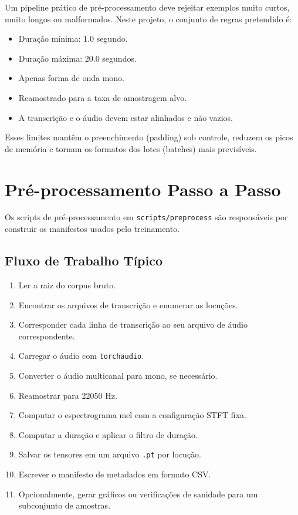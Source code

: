 \documentclass[11pt]{article}
\newcommand{\pathtt}[1]{\texttt{#1}}
\begin{document}
Um pipeline prático de pré-processamento deve rejeitar exemplos muito curtos, muito longos ou malformados. Neste projeto, o conjunto de regras pretendido é:

\begin{itemize}[leftmargin=1.5em]
  \item Duração mínima: 1.0 segundo.
  \item Duração máxima: 20.0 segundos.
  \item Apenas forma de onda mono.
  \item Reamostrado para a taxa de amostragem alvo.
  \item A transcrição e o áudio devem estar alinhados e não vazios.
\end{itemize}

Esses limites mantêm o preenchimento (padding) sob controle, reduzem os picos de memória e tornam os formatos dos lotes (batches) mais previsíveis.

\section{Pré-processamento Passo a Passo}

Os scripts de pré-processamento em \pathtt{scripts/preprocess} são responsáveis por construir os manifestos usados pelo treinamento.

\subsection{Fluxo de Trabalho Típico}

\begin{enumerate}[leftmargin=1.5em]
  \item Ler a raiz do corpus bruto.
  \item Encontrar os arquivos de transcrição e enumerar as locuções.
  \item Corresponder cada linha de transcrição ao seu arquivo de áudio correspondente.
  \item Carregar o áudio com \pathtt{torchaudio}.
  \item Converter o áudio multicanal para mono, se necessário.
  \item Reamostrar para 22050 Hz.
  \item Computar o espectrograma mel com a configuração STFT fixa.
  \item Computar a duração e aplicar o filtro de duração.
  \item Salvar os tensores em um arquivo \pathtt{.pt} por locução.
  \item Escrever o manifesto de metadados em formato CSV.
  \item Opcionalmente, gerar gráficos ou verificações de sanidade para um subconjunto de amostras.
\end{enumerate}
\end{document}
